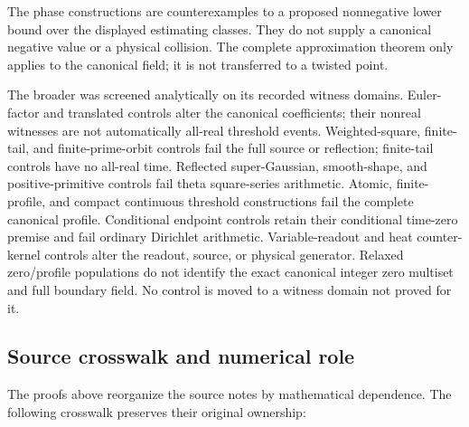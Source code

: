 The phase constructions are counterexamples to a proposed
nonnegative lower bound over the displayed estimating classes.
They do not supply a canonical negative value or a physical
collision. The complete approximation theorem only applies to the
canonical field; it is not transferred to a twisted point.

The broader
was screened analytically on its recorded witness domains.
Euler-factor and translated controls alter the canonical coefficients;
their nonreal witnesses are not automatically all-real threshold events.
Weighted-square, finite-tail, and finite-prime-orbit controls fail the
full source or reflection; finite-tail controls have no all-real time.
Reflected super-Gaussian, smooth-shape, and positive-primitive controls
fail theta square-series arithmetic. Atomic, finite-profile, and compact
continuous threshold constructions fail the complete canonical profile.
Conditional endpoint controls retain their conditional time-zero premise
and fail ordinary Dirichlet arithmetic. Variable-readout and heat
counter-kernel controls alter the readout, source, or physical generator.
Relaxed zero/profile populations do not identify the exact canonical
integer zero multiset and full boundary field.
No control is moved to a witness domain not proved for it.

\subsection{Source crosswalk and numerical role}\label{sec:crosswalk}

The proofs above reorganize the source notes by mathematical dependence.
The following crosswalk preserves their original ownership:

